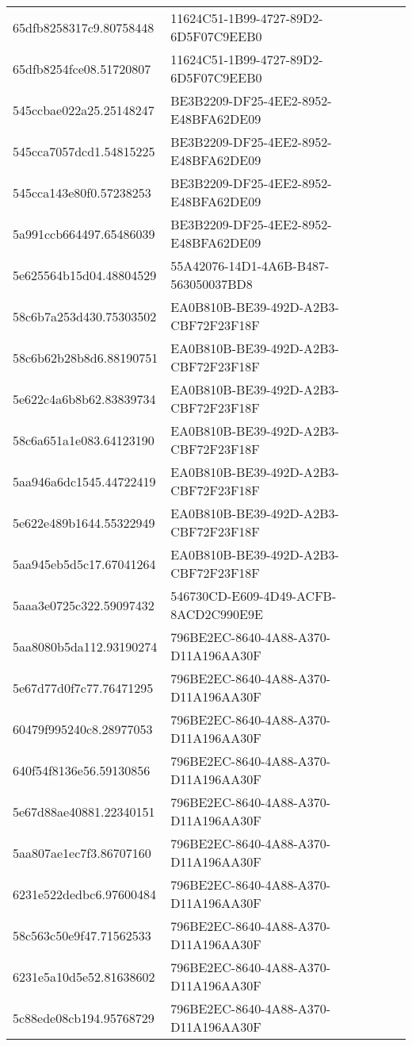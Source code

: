 \begin{tabular}{ll}
65dfb8258317c9.80758448 & 11624C51-1B99-4727-89D2-6D5F07C9EEB0 \\
65dfb8254fce08.51720807 & 11624C51-1B99-4727-89D2-6D5F07C9EEB0 \\
545ccbae022a25.25148247 & BE3B2209-DF25-4EE2-8952-E48BFA62DE09 \\
545cca7057dcd1.54815225 & BE3B2209-DF25-4EE2-8952-E48BFA62DE09 \\
545cca143e80f0.57238253 & BE3B2209-DF25-4EE2-8952-E48BFA62DE09 \\
5a991ccb664497.65486039 & BE3B2209-DF25-4EE2-8952-E48BFA62DE09 \\
5e625564b15d04.48804529 & 55A42076-14D1-4A6B-B487-563050037BD8 \\
58c6b7a253d430.75303502 & EA0B810B-BE39-492D-A2B3-CBF72F23F18F \\
58c6b62b28b8d6.88190751 & EA0B810B-BE39-492D-A2B3-CBF72F23F18F \\
5e622c4a6b8b62.83839734 & EA0B810B-BE39-492D-A2B3-CBF72F23F18F \\
58c6a651a1e083.64123190 & EA0B810B-BE39-492D-A2B3-CBF72F23F18F \\
5aa946a6dc1545.44722419 & EA0B810B-BE39-492D-A2B3-CBF72F23F18F \\
5e622e489b1644.55322949 & EA0B810B-BE39-492D-A2B3-CBF72F23F18F \\
5aa945eb5d5c17.67041264 & EA0B810B-BE39-492D-A2B3-CBF72F23F18F \\
5aaa3e0725c322.59097432 & 546730CD-E609-4D49-ACFB-8ACD2C990E9E \\
5aa8080b5da112.93190274 & 796BE2EC-8640-4A88-A370-D11A196AA30F \\
5e67d77d0f7c77.76471295 & 796BE2EC-8640-4A88-A370-D11A196AA30F \\
60479f995240c8.28977053 & 796BE2EC-8640-4A88-A370-D11A196AA30F \\
640f54f8136e56.59130856 & 796BE2EC-8640-4A88-A370-D11A196AA30F \\
5e67d88ae40881.22340151 & 796BE2EC-8640-4A88-A370-D11A196AA30F \\
5aa807ae1ec7f3.86707160 & 796BE2EC-8640-4A88-A370-D11A196AA30F \\
6231e522dedbc6.97600484 & 796BE2EC-8640-4A88-A370-D11A196AA30F \\
58c563c50e9f47.71562533 & 796BE2EC-8640-4A88-A370-D11A196AA30F \\
6231e5a10d5e52.81638602 & 796BE2EC-8640-4A88-A370-D11A196AA30F \\
5c88ede08cb194.95768729 & 796BE2EC-8640-4A88-A370-D11A196AA30F \\

\end{tabular}
